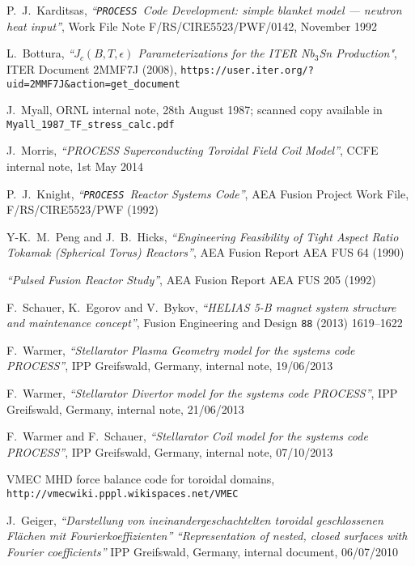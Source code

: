 \documentclass[11pt,a4paper]{report}
\newcommand{\process}{\mbox{\texttt{PROCESS}}}
\begin{document}
\begin{thebibliography}{99}
P.\ J.\ Karditsas, \textit{``\process\ Code Development: simple blanket model ---
neutron heat input''},
Work File Note F/RS/CIRE5523/PWF/0142, November 1992

L.\ Bottura,
\textit{``$J_c(B,T,\epsilon)$ Parameterizations for the ITER Nb$_3$Sn
  Production"},
ITER Document 2MMF7J (2008),
\texttt{https://user.iter.org/?uid=2MMF7J\&action=get\_document}

J.\ Myall,
ORNL internal note, 28th August 1987; scanned copy available in
\texttt{Myall\_1987\_TF\_stress\_calc.pdf}

J.\ Morris,
\textit{``PROCESS Superconducting Toroidal Field Coil Model''},
CCFE internal note, 1st May 2014

P.\ J.\ Knight,
\textit{``\process\ Reactor Systems Code''},
AEA Fusion Project Work File, F/RS/CIRE5523/PWF
(1992)

Y-K.\ M.\ Peng and J.\ B.\ Hicks,
\textit{``Engineering Feasibility of Tight Aspect Ratio Tokamak
(Spherical Torus) Reactors''},
AEA Fusion Report AEA FUS 64 (1990)

\textit{``Pulsed Fusion Reactor Study''},
AEA Fusion Report AEA FUS 205
(1992)

F.\ Schauer, K.\ Egorov and V.\ Bykov,
\textit{``HELIAS 5-B magnet system structure and maintenance concept''},
Fusion Engineering and Design \texttt{88} (2013) 1619--1622

F.\ Warmer,
\textit{``Stellarator Plasma Geometry model for the systems code PROCESS''},
IPP Greifswald, Germany, internal note, 19/06/2013

F.\ Warmer,
\textit{``Stellarator Divertor model for the systems code PROCESS''},
IPP Greifswald, Germany, internal note, 21/06/2013

F.\ Warmer and F.\ Schauer,
\textit{``Stellarator Coil model for the systems code PROCESS''},
IPP Greifswald, Germany, internal note, 07/10/2013

VMEC MHD force balance code for toroidal domains,
\texttt{http://vmecwiki.pppl.wikispaces.net/VMEC}

J.\ Geiger,
\textit{``Darstellung von ineinandergeschachtelten toroidal geschlossenen
  Fl\"{a}chen mit Fourierkoeffizienten''} \textit{``Representation of
  nested, closed surfaces with Fourier coefficients''}
IPP Greifswald, Germany, internal document, 06/07/2010


\end{thebibliography}
\end{document}
